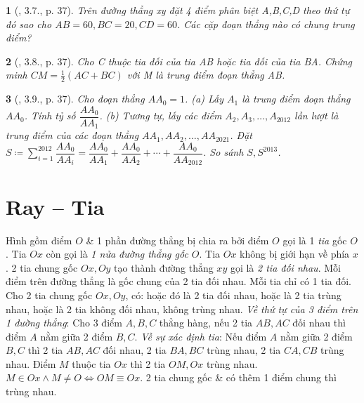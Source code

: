 \documentclass{article}
\newtheorem{baitoan}{}
\begin{document}
\begin{baitoan}[\cite{TLCT_THCS_Toan_6_hinh_hoc}, 3.7., p. 37]
	Trên đường thẳng xy đặt 4 điểm phân biệt A,B,C,D theo thứ tự đó sao cho $AB = 60,BC = 20,CD = 60$. Các cặp đoạn thẳng nào có chung trung điểm?
\end{baitoan}

\begin{baitoan}[\cite{TLCT_THCS_Toan_6_hinh_hoc}, 3.8., p. 37]
	Cho C thuộc tia đối của tia AB hoặc tia đối của tia BA. Chứng minh $CM = \frac{1}{2}(AC + BC)$ với M là trung điểm đoạn thẳng AB.
\end{baitoan}

\begin{baitoan}[\cite{TLCT_THCS_Toan_6_hinh_hoc}, 3.9., p. 37]
	Cho đoạn thẳng $AA_0 = 1$. (a) Lấy $A_1$ là trung điểm đoạn thẳng $AA_0$. Tính tỷ số $\dfrac{AA_0}{AA_1}$. (b) Tương tự, lấy các điểm $A_2,A_3,\ldots,A_{2012}$ lần lượt là trung điểm của các đoạn thẳng $AA_1,AA_2,\ldots,AA_{2021}$. Đặt $S\coloneqq\sum_{i=1}^{2012} \dfrac{AA_0}{AA_i} = \dfrac{AA_0}{AA_1} + \dfrac{AA_0}{AA_2} + \cdots + \dfrac{AA_0}{AA_{2012}}$. So sánh $S,S^{2013}$.
\end{baitoan}


\section{Ray -- Tia}
 Hình gồm điểm $O$ \& 1 phần đường thẳng bị chia ra bởi điểm $O$ gọi là 1 \textit{tia} gốc $O$. Tia $Ox$ còn gọi là \textit{1 nửa đường thẳng gốc $O$}. Tia $Ox$ không bị giới hạn về phía $x$.  2 tia chung gốc $Ox,Oy$ tạo thành đường thẳng $xy$ gọi là \textit{2 tia đối nhau}. Mỗi điểm trên đường thẳng là gốc chung của 2 tia đối nhau. Mỗi tia chỉ có 1 tia đối.  Cho 2 tia chung gốc $Ox,Oy$, có: hoặc đó là 2 tia đối nhau, hoặc là 2 tia trùng nhau, hoặc là 2 tia không đối nhau, không trùng nhau.  \textit{Về thứ tự của 3 điểm trên 1 đường thẳng}: Cho 3 điểm $A,B,C$ thẳng hàng, nếu 2 tia $AB,AC$ đối nhau thì điểm $A$ nằm giữa 2 điểm $B,C$.  \textit{Về sự xác định tia}: Nếu điểm $A$ nằm giữa 2 điểm $B,C$ thì 2 tia $AB,AC$ đối nhau, 2 tia $BA,BC$ trùng nhau, 2 tia $CA,CB$ trùng nhau.  Điểm $M$ thuộc tia $Ox$ thì 2 tia $OM,Ox$ trùng nhau. $M\in Ox\land M\ne O\Leftrightarrow OM\equiv Ox$.  2 tia chung gốc \& có thêm 1 điểm chung thì trùng nhau.
\end{document}
